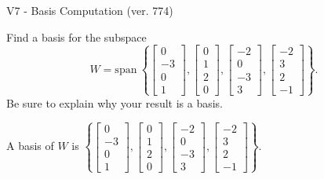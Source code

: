 \begin{exercise}
  \begin{exerciseTitle}V7 - Basis Computation (ver. 774)\end{exerciseTitle}
  \begin{exerciseStatement}
    Find a basis for the subspace 
\[W=\mathrm{span}\ \left\{\left[\begin{array}{r}
0 \\
-3 \\
0 \\
1
\end{array}\right] , \left[\begin{array}{r}
0 \\
1 \\
2 \\
0
\end{array}\right] , \left[\begin{array}{r}
-2 \\
0 \\
-3 \\
3
\end{array}\right] , \left[\begin{array}{r}
-2 \\
3 \\
2 \\
-1
\end{array}\right]\right\}.\]
 Be sure to explain why your result is a basis.


  \end{exerciseStatement}
  \begin{exerciseAnswer}
   A basis of \(W\) is  \(\left\{\left[\begin{array}{r}
0 \\
-3 \\
0 \\
1
\end{array}\right] , \left[\begin{array}{r}
0 \\
1 \\
2 \\
0
\end{array}\right] , \left[\begin{array}{r}
-2 \\
0 \\
-3 \\
3
\end{array}\right] , \left[\begin{array}{r}
-2 \\
3 \\
2 \\
-1
\end{array}\right]\right\}\).
  


  \end{exerciseAnswer}
\end{exercise}